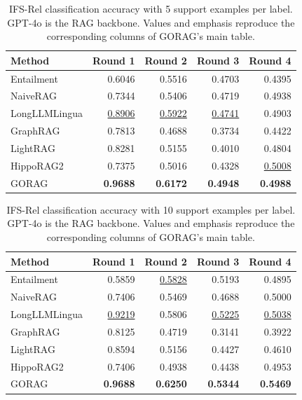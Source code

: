 \begin{table}[tbp]
\centering
\caption{IFS-Rel classification accuracy with 5 support examples per label. GPT-4o is the RAG backbone. Values and emphasis reproduce the corresponding columns of GORAG's main table.}
\label{tab:gorag:main-ifs-5shot}
\small
\begin{tabular}{lrrrr}
\hline
Method & Round 1 & Round 2 & Round 3 & Round 4\\
\hline
Entailment & {0.6046} & {0.5516} & {0.4703} & {0.4395} \\
NaiveRAG & 0.7344 & 0.5406 & 0.4719 & {0.4938} \\
LongLLMLingua & \underline{0.8906} & \underline{0.5922} & \underline{0.4741} & 0.4903 \\
GraphRAG & 0.7813 & 0.4688 & 0.3734 & 0.4422 \\
LightRAG & 0.8281 & 0.5155 & 0.4010 & 0.4804 \\
HippoRAG2 & 0.7375 & 0.5016 & 0.4328 & \underline{0.5008} \\
GORAG & \textbf{0.9688} & \textbf{0.6172} & \textbf{0.4948} & \textbf{0.4988} \\
\hline
\end{tabular}
\end{table}

\begin{table}[tbp]
\centering
\caption{IFS-Rel classification accuracy with 10 support examples per label. GPT-4o is the RAG backbone. Values and emphasis reproduce the corresponding columns of GORAG's main table.}
\label{tab:gorag:main-ifs-10shot}
\small
\begin{tabular}{lrrrr}
\hline
Method & Round 1 & Round 2 & Round 3 & Round 4\\
\hline
Entailment & {0.5859} & \underline{0.5828} & {0.5193} & {0.4895} \\
NaiveRAG & 0.7406 & 0.5469 & 0.4688 & 0.5000 \\
LongLLMLingua & \underline{0.9219} & 0.5806 & \underline{0.5225} & \underline{0.5038} \\
GraphRAG & 0.8125 & 0.4719 & 0.3141 & 0.3922 \\
LightRAG & 0.8594 & 0.5156 & 0.4427 & 0.4610 \\
HippoRAG2 & 0.7406 & 0.4938 & 0.4438 & 0.4953 \\
GORAG & \textbf{0.9688} & \textbf{0.6250} & \textbf{0.5344} & \textbf{0.5469} \\
\hline
\end{tabular}
\end{table}

